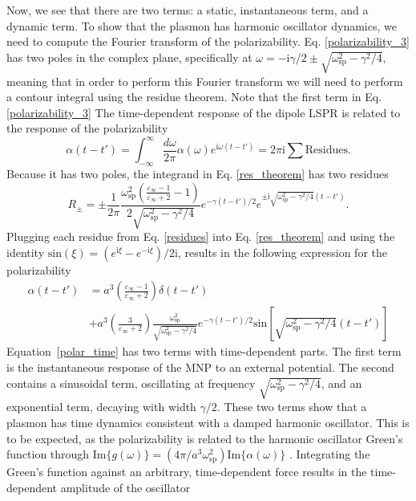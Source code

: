 \documentclass [11pt, proquest] {uwthesis}[2016/11/22]
\begin{document}
Now, we see that there are two terms: a static, instantaneous term, and a dynamic term. To show that the plasmon has harmonic oscillator dynamics, we need to compute the Fourier transform of the polarizability. Eq. \ref{polarizability_3} has two poles in the complex plane, specifically at $\omega = -\textrm{i}\gamma/2 \pm \sqrt{\omega_\textrm{sp}^2-\gamma^2/4}$, meaning that in order to perform this Fourier transform we will need to perform a contour integral using the residue theorem. Note that the first term in Eq. \ref{polarizability_3}  The time-dependent response of the dipole LSPR is related to the response of the polarizability \cite{ARPC,Quillin}
\begin{equation}
\alpha(t-t') = \int_{-\infty}^{\infty}\frac{d\omega}{2\pi}\alpha(\omega)e^{\textrm{i}\omega (t-t')} = 2\pi\textrm{i}\sum\textrm{Residues}.
\label{res_theorem}
\end{equation}
Because it has two poles, the integrand in Eq. \ref{res_theorem} has two residues
\begin{equation}
R_{\pm} = \pm\frac{1}{2\pi}\frac{\omega_{\textrm{sp}}^2\left(\frac{\varepsilon_{\infty}-1}{\varepsilon_{\infty}+2}-1\right)}{2\sqrt{\omega_\textrm{sp}^2-\gamma^2/4}}e^{-\gamma (t-t')/2}e^{\pm\textrm{i}\sqrt{\omega_\textrm{sp}^2-\gamma^2/4}(t-t')}.
\label{residues}
\end{equation}
Plugging each residue from Eq. \ref{residues} into Eq. \ref{res_theorem} and using the identity $\textrm{sin}(\xi) = (e^{\textrm{i}\xi} - e^{-\textrm{i}\xi})/2\textrm{i}$, results in the following expression for the polarizability
\begin{equation}
\begin{aligned}
\alpha(t-t') &= a^3\left(\frac{\varepsilon_{\infty}-1}{\varepsilon_{\infty}+2}\right)\delta(t-t')\\
 & + a^3\left(\frac{3}{\varepsilon_{\infty}+2}\right)\frac{\omega_{\textrm{sp}}^2}{\sqrt{\omega_\textrm{sp}^2-\gamma^2/4}}e^{-\gamma (t-t')/2}\textrm{sin}\left[\sqrt{\omega_{\textrm{sp}}^2-\gamma^2/4}(t-t')\right]
\label{polar_time}
\end{aligned}
\end{equation}
Equation~\ref{polar_time} has two terms with time-dependent parts. The first term is the instantaneous response of the MNP to an external potential. The second contains a sinusoidal term, oscillating at frequency $\sqrt{\omega_\textrm{sp}^2-\gamma^2/4}$, and an exponential term, decaying with width $\gamma/2$. These two terms show that a plasmon has time dynamics consistent with a damped harmonic oscillator. This is to be expected, as the polarizability is related to the harmonic oscillator Green's function through $\textrm{Im}\{g(\omega)\} = (4\pi/a^3\omega_{\textrm{sp}}^2)\textrm{Im}\{\alpha(\omega)\}$ \cite{ARPC,Quillin}. Integrating the Green's function against an arbitrary, time-dependent force results in the time-dependent amplitude of the oscillator
\end{document}
